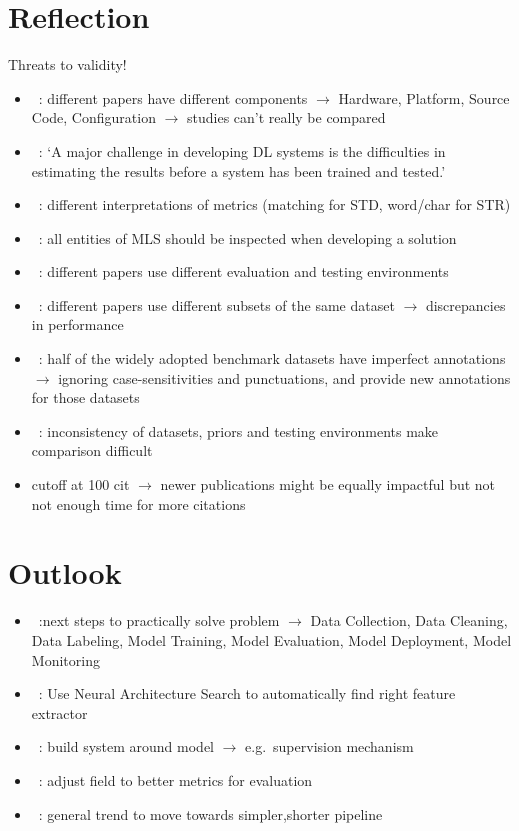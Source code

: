 \section{Reflection}
Threats to validity!
\begin{itemize}
    \item~\cite{arpteg_software_2018}: different papers have different components
        $\rightarrow$ Hardware, Platform, Source Code, Configuration
        $\rightarrow$ studies can't really be compared
    \item~\cite{arpteg_software_2018}: `A major challenge in developing DL systems is the
        difficulties in estimating the results before a system has been trained and tested.'
    \item~\cite{long_scene_2021}: different interpretations of metrics (matching for \ac{STD},
        word/char for \ac{STR})
    \item~\cite{siebert_construction_2021,nakamichi_requirements-driven_2020}: all entities of
        \ac{MLS} should be inspected when developing a solution
    \item~\cite{baek_what_2019}: different papers use different evaluation and testing environments
    \item~\cite{baek_what_2019}: different papers use different subsets of the same dataset
        $\rightarrow$ discrepancies in performance
    \item~\cite{long_unrealtext_2020}: half of the widely adopted benchmark datasets have imperfect
        annotations $\rightarrow$ ignoring case-sensitivities and punctuations, and provide new
        annotations for those datasets
    \item~\cite{chen_text_2021}: inconsistency of datasets, priors and testing environments make
        comparison difficult
    \item cutoff at 100 cit $\rightarrow$ newer publications might be equally impactful but not
        not enough time for more citations
\end{itemize}

\section{Outlook}

\begin{itemize}
    \item~\cite{watanabe_preliminary_2019}:next steps to practically solve problem
        $\rightarrow$  Data Collection, Data Cleaning, Data Labeling, Model Training,
        Model Evaluation, Model Deployment, Model Monitoring
    \item~\cite{zhao_improving_2020}: Use Neural Architecture Search to automatically find right
        feature extractor
    \item~\cite{siebert_construction_2021,nakamichi_requirements-driven_2020}: build system around
        model $\rightarrow$ e.g.\ supervision mechanism
    \item~\cite{shi_icdar2017_2017,he_icpr2018_2018}: adjust field to better metrics for evaluation
    \item~\cite{long_scene_2021}: general trend to move towards simpler,shorter pipeline
\end{itemize}
